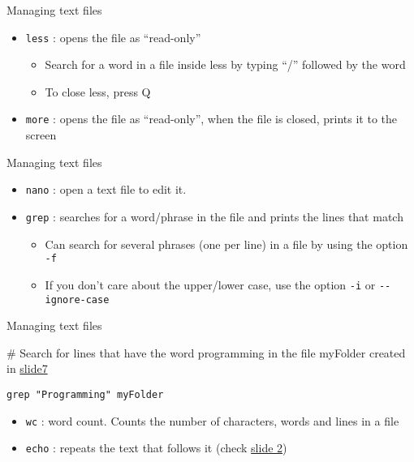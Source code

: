 \documentclass[
  ignorenonframetext,
]{beamer}
\providecommand{\tightlist}{%
  \setlength{\itemsep}{0pt}\setlength{\parskip}{0pt}}
\begin{document}
\begin{frame}[fragile]{Managing text files}
\protect\hypertarget{slide9}{}
\begin{itemize}[<+->]
\tightlist
\item
  {\texttt{less}} : opens the file as ``read-only''

  \begin{itemize}[<+->]
  \tightlist
  \item
    Search for a word in a file inside less by typing ``/'' followed by
    the word
  \item
    To close less, press Q
  \end{itemize}
\item
  {\texttt{more}} : opens the file as ``read-only'', when the file is
  closed, prints it to the screen
\end{itemize}
\end{frame}

\begin{frame}[fragile]{Managing text files}
\protect\hypertarget{slide10}{}
\begin{itemize}[<+->]
\tightlist
\item
  {\texttt{nano}} : open a text file to edit it.
\item
  {\texttt{grep}} : searches for a word/phrase in the file and prints
  the lines that match

  \begin{itemize}[<+->]
  \tightlist
  \item
    Can search for several phrases (one per line) in a file by using the
    option \texttt{-f}
  \item
    If you don't care about the upper/lower case, use the option
    \texttt{-i} or \texttt{-\/-ignore-case}
  \end{itemize}
\end{itemize}
\end{frame}

\begin{frame}[fragile]{Managing text files}
\protect\hypertarget{slide11}{}
\begin{block}{}
\protect\hypertarget{section-10}{}
\# {Search for lines that have the word programming in the file myFolder
created in \protect\hyperlink{7}{slide7}}

\texttt{grep\ "Programming"\ myFolder}
\end{block}

\begin{block}{}
\protect\hypertarget{section-11}{}
\begin{itemize}[<+->]
\tightlist
\item
  {\texttt{wc}} : word count. Counts the number of characters, words and
  lines in a file
\item
  {\texttt{echo}} : repeats the text that follows it (check
  \protect\hyperlink{2}{slide 2})
\end{itemize}
\end{block}
\end{frame}
\end{document}
